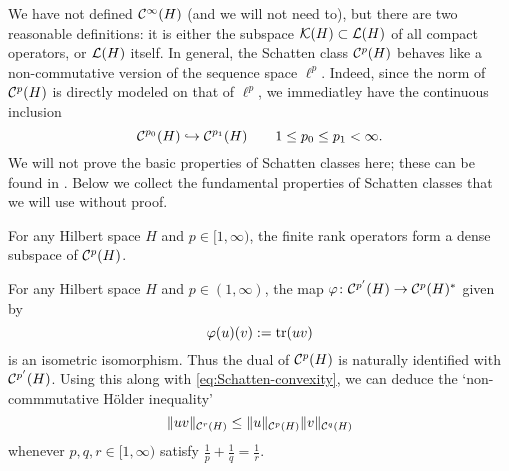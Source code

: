 We have not defined $\mathcal{C}^\infty(H)$ (and we will not need to), but there are two reasonable definitions: it is either the subspace $\mathcal{K}(H) \subset \mathcal{L}(H)$ of all compact operators, or $\mathcal{L}(H)$ itself.
In general, the Schatten class $\mathcal{C}^{p}(H)$ behaves like a non-commutative version of the sequence space $\ell^{p}$.
Indeed, since the norm of $\mathcal{C}^{p}(H)$ is directly modeled on that of $\ell^{p}$, we immediatley have the continuous inclusion
\begin{equation*}
  \mathcal{C}^{p_{0}}(H) \hookrightarrow \mathcal{C}^{p_{1}}(H) \qquad 1 \leq p_0 \leq p_1 < \infty.
\end{equation*}
We will not prove the basic properties of Schatten classes here; these can be found in \cite[Appendix D]{HNVW16}.
Below we collect the fundamental properties of Schatten classes that we will use without proof.

\begin{prop}
  For any Hilbert space $H$ and $p \in [1,\infty)$, the finite rank operators form a dense subspace of $\mathcal{C}^{p}(H)$.
\end{prop}

\begin{prop}[Duality]\label{prop:Schatten-duality}
  For any Hilbert space $H$ and $p \in (1,\infty)$, the map $\varphi \colon \mathcal{C}^{p'}(H) \rightarrow \mathcal{C}^{p}(H)^*$ given by
  \begin{equation*}
    \varphi(u)(v) := \operatorname{tr}(uv)
  \end{equation*}
  is an isometric isomorphism.
  Thus the dual of $\mathcal{C}^{p}(H)$ is naturally identified with $\mathcal{C}^{p'}(H)$.
  Using this along with \ref{eq:Schatten-convexity}, we can deduce the `non-commmutative H\"older inequality'
  \begin{equation}\label{eq:NC-holder}
    \|uv\|_{\mathcal{C}^{r}(H)} \leq \|u\|_{\mathcal{C}^{p}(H)} \|v\|_{\mathcal{C}^{q}(H)}
  \end{equation}
  whenever $p,q,r \in [1,\infty)$ satisfy $\frac{1}{p} + \frac{1}{q} = \frac{1}{r}$.
\end{prop}

